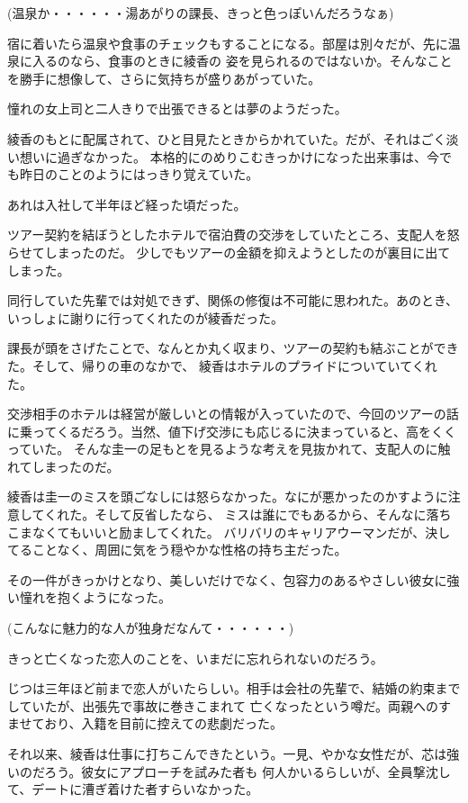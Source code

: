 ﻿\documentclass[book,tate]{jlreq}
\begin{document}
(温泉か・・・・・・湯あがりの課長、きっと色っぽいんだろうなぁ)

宿に着いたら温泉や食事のチェックもすることになる。部屋は別々だが、先に温泉に入るのなら、食事のときに綾香の
姿を見られるのではないか。そんなことを勝手に想像して、さらに気持ちが盛りあがっていた。

憧れの女上司と二人きりで出張できるとは夢のようだった。

綾香のもとに配属されて、ひと目見たときからかれていた。だが、それはごく淡い想いに過ぎなかった。
本格的にのめりこむきっかけになった出来事は、今でも昨日のことのようにはっきり覚えていた。

あれは入社して半年ほど経った頃だった。

ツアー契約を結ぼうとしたホテルで宿泊費の交渉をしていたところ、支配人を怒らせてしまったのだ。
少しでもツアーの金額を抑えようとしたのが裏目に出てしまった。

同行していた先輩では対処できず、関係の修復は不可能に思われた。あのとき、いっしょに謝りに行ってくれたのが綾香だった。

課長が頭をさげたことで、なんとか丸く収まり、ツアーの契約も結ぶことができた。そして、帰りの車のなかで、
綾香はホテルのプライドについていてくれた。

交渉相手のホテルは経営が厳しいとの情報が入っていたので、今回のツアーの話に乗ってくるだろう。当然、値下げ交渉にも応じるに決まっていると、高をくくっていた。
そんな圭一の足もとを見るような考えを見抜かれて、支配人のに触れてしまったのだ。

綾香は圭一のミスを頭ごなしには怒らなかった。なにが悪かったのかすように注意してくれた。そして反省したなら、 
ミスは誰にでもあるから、そんなに落ちこまなくてもいいと励ましてくれた。
バリバリのキャリアウーマンだが、決してることなく、周囲に気をう穏やかな性格の持ち主だった。

その一件がきっかけとなり、美しいだけでなく、包容力のあるやさしい彼女に強い憧れを抱くようになった。

(こんなに魅力的な人が独身だなんて・・・・・・)

きっと亡くなった恋人のことを、いまだに忘れられないのだろう。

じつは三年ほど前まで恋人がいたらしい。相手は会社の先輩で、結婚の約束までしていたが、出張先で事故に巻きこまれて
亡くなったという噂だ。両親へのすませており、入籍を目前に控えての悲劇だった。

それ以来、綾香は仕事に打ちこんできたという。一見、やかな女性だが、芯は強いのだろう。彼女にアプローチを試みた者も
何人かいるらしいが、全員撃沈して、デートに漕ぎ着けた者すらいなかった。
\end{document}

